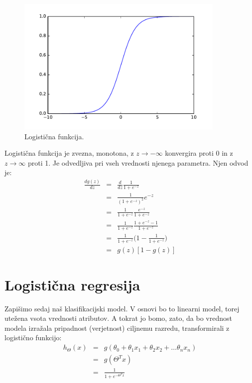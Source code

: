 \begin{figure}[htbp]
\begin{center}
\includegraphics[width=10cm]{slike/logistic.pdf}
\caption{Logistična funkcija.}
\label{f:logistic-function}
\end{center}
\end{figure}

Logistična funkcija je zvezna, monotona, z $z\to -\infty$ konvergira proti 0 in z $z\to\infty$ proti 1. Je odvedljiva pri vseh vrednosti njenega parametra. Njen odvod je:
\begin{eqnarray}
  \frac{dg(z)}{dz} & = & \frac{d}{dz} \frac{1}{1+e^{-z}} \nonumber \\
  & = & \frac{1}{(1+e^{-z})^2} e^{-z} \nonumber \\
  & = & \frac{1}{1+e^{-z}}\frac{e^{-z}}{1+e^{-z}} \nonumber \\
  & = & \frac{1}{1+e^{-z}}\frac{1+e^{-z}-1}{1+e^{-z}} \nonumber \\
  & = & \frac{1}{1+e^{-z}}\big(1-\frac{1}{1+e^{-z}}\big) \nonumber \\
  & = & g(z)[1-g(z)]
\end{eqnarray}

\section{Logistična regresija}

Zapišimo sedaj naš klasifikacijski model. V osnovi bo to linearni model, torej utežena vsota vrednosti atributov. A tokrat jo bomo, zato, da bo vrednost modela izražala pripadnost (verjetnost) ciljnemu razredu, transformirali z logistično funkcijo:
\begin{eqnarray}
  h_\Theta(x) & = & g(\theta_0+\theta_1 x_1+\theta_2 x_2+\ldots\theta_n x_n)
  \nonumber \\
  & = & g(\Theta^T x) \nonumber \\
  & = & \frac{1}{1+e^{-\Theta^T x}}
  \label{eq:logreg}
\end{eqnarray}

